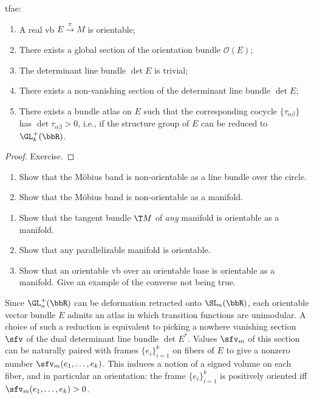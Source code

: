 \begin{prop}\label{prop orientation}
    \gls{tfae}:
    \begin{enumerate}
        \item A real \gls{vb} $E\overset\pi\to M$ is orientable;
        \item There exists a global section of the orientation bundle $\mathcal{O}(E)$;
        \item The determinant line bundle $\det E$ is trivial;
        \item There exists a non-vanishing section of the determinant line bundle $\det E$;
        \item There exists a bundle atlas on $E$ such that the corresponding cocycle $\{\tau_{\alpha\beta}\}$ has $\det\tau_{\alpha\beta}>0$, i.e., if the structure group of $E$ can be reduced to $\GL^+_k(\bbR )$.
    \end{enumerate}
\end{prop}
\begin{proof}
    Exercise.
\end{proof}

\begin{xca}
\begin{enumerate}
    \item Show that the M\"obius band is non-orientable as a line bundle over the circle.
    \item Show that the M\"obius band is non-orientable as a manifold.
\end{enumerate}
\end{xca}

\begin{xca}
\begin{enumerate}
    \item Show that the tangent bundle $\T M$ of \emph{any} manifold is orientable as a manifold.
    \item Show that any parallelizable manifold is orientable.
    \item Show that an orientable \gls{vb} over an orientable base is orientable as a manifold. Give an example of the converse not being true.
\end{enumerate}
\end{xca}

Since $\GL^+_n(\bbR)$ can be deformation retracted onto $\SL_n(\bbR)$, each orientable vector bundle $E$ admits an atlas in which transition functions are unimodular. A choice of such a reduction is equivalent to picking a nowhere vanishing section $\sfv$ of the dual determinant line bundle $\det E^\ast$. Values $\sfv_m$ of this section can be naturally paired with frames $\{e_i\}_{i=1}^k$ on fibers of $E$ to give a nonzero number $\sfv_m(e_1,\ldots,e_k)$. This induces a notion of a signed volume on each fiber, and in particular an orientation: the frame $\{e_i\}_{i=1}^k$ is positively oriented iff $\sfv_m(e_1,\ldots,e_k)>0$.


